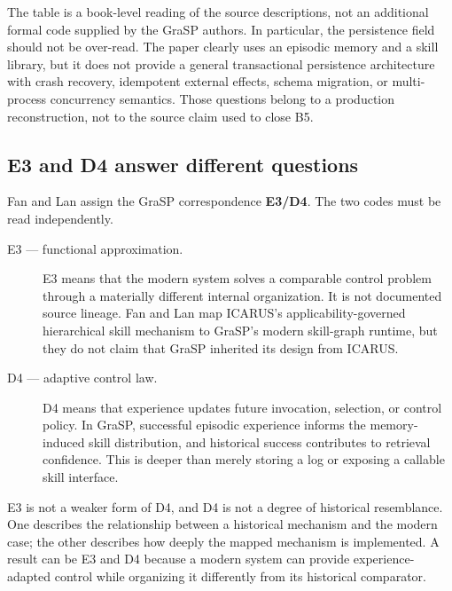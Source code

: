 The table is a book-level reading of the source descriptions, not an additional formal code supplied by the GraSP authors. In particular, the persistence field should not be over-read. The paper clearly uses an episodic memory and a skill library, but it does not provide a general transactional persistence architecture with crash recovery, idempotent external effects, schema migration, or multi-process concurrency semantics. Those questions belong to a production reconstruction, not to the source claim used to close B5.

\subsection{E3 and D4 answer different questions}

Fan and Lan assign the GraSP correspondence \textbf{E3/D4}. The two codes must be read independently.

\begin{description}
  \item[E3 — functional approximation.] E3 means that the modern system solves a comparable control problem through a materially different internal organization. It is not documented source lineage. Fan and Lan map ICARUS's applicability-governed hierarchical skill mechanism to GraSP's modern skill-graph runtime, but they do not claim that GraSP inherited its design from ICARUS.
  \item[D4 — adaptive control law.] D4 means that experience updates future invocation, selection, or control policy. In GraSP, successful episodic experience informs the memory-induced skill distribution, and historical success contributes to retrieval confidence. This is deeper than merely storing a log or exposing a callable skill interface.
\end{description}

E3 is not a weaker form of D4, and D4 is not a degree of historical resemblance. One describes the relationship between a historical mechanism and the modern case; the other describes how deeply the mapped mechanism is implemented. A result can be E3 and D4 because a modern system can provide experience-adapted control while organizing it differently from its historical comparator.


